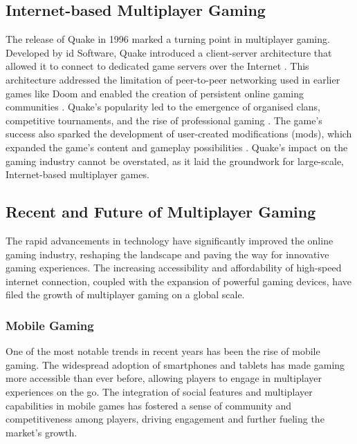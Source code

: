 \subsection{Internet-based Multiplayer Gaming}
The release of Quake in 1996 marked a turning point in multiplayer gaming. Developed by id Software, Quake introduced a client-server architecture that allowed it to connect to dedicated game servers over the Internet \cite{arm2006networking}. This architecture addressed the limitation of peer-to-peer networking used in earlier games like Doom and enabled the creation of persistent online gaming communities \cite{Doom}. Quake's popularity led to the emergence of organised clans, competitive tournaments, and the rise of professional gaming \cite{arm2006networking}. The game's success also sparked the development of user-created modifications (mods), which expanded the game's content and gameplay possibilities \cite{Doom}.
Quake's impact on the gaming industry cannot be overstated, as it laid the groundwork for large-scale, Internet-based multiplayer games.

\subsection{Recent and Future of  Multiplayer Gaming}
The rapid advancements in technology have significantly improved the online gaming industry, reshaping the landscape and paving the way for innovative gaming experiences. The increasing accessibility and affordability of high-speed internet connection, coupled with the expansion of powerful gaming devices, have filed the growth of multiplayer gaming on a global scale.

\subsubsection{Mobile Gaming}
One of the most notable trends in recent years has been the rise of mobile gaming. The widespread adoption of smartphones and tablets has made gaming more accessible than ever before, allowing players to engage in multiplayer experiences on the go. The integration of social features and multiplayer capabilities in mobile games has fostered a sense of community and competitiveness among players, driving engagement and further fueling the market's growth.
